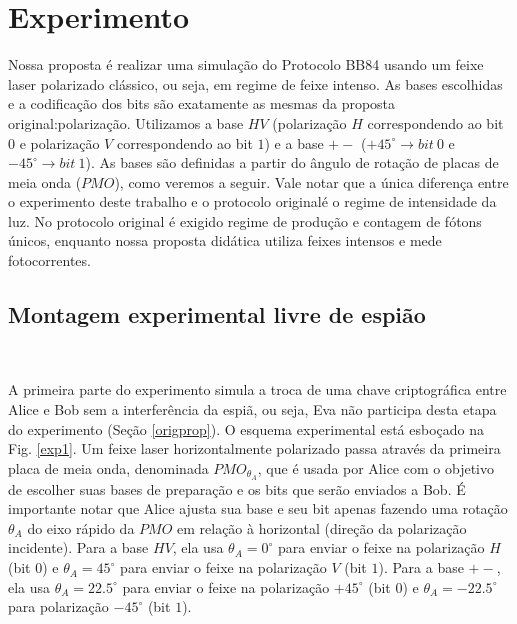 \documentclass[pra, twocolumn]{revtex4}
\begin{document}
\section{Experimento}

Nossa proposta \'e realizar uma simula\c c\~ao do Protocolo BB84 usando um feixe laser polarizado cl\'assico, ou seja, em regime de feixe intenso. As bases escolhidas e a codifica\c c\~ao dos bits s\~ao exatamente as mesmas da proposta original:polariza\c c\~ao. Utilizamos a base $HV$ (polariza\c c\~ao $H$ correspondendo ao bit $0$ e polariza\c c\~ao $V$ correspondendo ao bit $1$) e a base $+-$ ($+45^\circ \rightarrow bit~ 0$ e $-45^\circ \rightarrow bit ~ 1$). As bases s\~ao definidas a partir do \^angulo de rota\c c\~ao de placas de meia onda ($PMO$), como veremos a seguir. Vale notar que a \'unica diferen\c ca entre o experimento deste trabalho e o protocolo original\'e o regime de intensidade da luz. No protocolo original \'e exigido regime de produ\c c\~ao e contagem de f\'otons \'unicos, enquanto nossa proposta did\'atica utiliza feixes intensos e mede fotocorrentes. 

\subsection{Montagem experimental livre de espi\~ao}\
\label{semEva}

A primeira parte do experimento simula a troca de uma chave criptogr\'afica entre Alice e Bob sem a interfer\^encia da espi\~a, ou seja, Eva n\~ao participa desta etapa do experimento (Se\c c\~ao \ref{origprop}). O esquema experimental est\'a esbo\c cado na Fig. \ref{exp1}. Um feixe laser horizontalmente polarizado passa atrav\'es da primeira placa de meia onda, denominada $PMO_{\theta_A} $, que \'e usada por Alice com o objetivo de escolher suas bases de prepara\c c\~ao e os bits que ser\~ao enviados a Bob. \'E importante notar que Alice ajusta sua base e seu bit apenas fazendo uma rota\c c\~ao  $\theta_A$ do eixo r\'apido da $PMO$ em rela\c c\~ao \`a horizontal (dire\c c\~ao da polariza\c c\~ao incidente). Para a base $HV$, ela usa $\theta_A = 0^\circ$ para enviar o feixe na polariza\c c\~ao $H$ (bit $0$) e $\theta_A = 45^\circ$ para enviar o feixe na polariza\c c\~ao $V$ (bit $1$). Para a base $+-$, ela usa  $\theta_A = 22.5^\circ$ para enviar o feixe na polariza\c c\~ao $+45^\circ$ (bit $0$) e $\theta_A = -22.5^\circ$ para polariza\c c\~ao $-45^\circ$ (bit $1$). 
\end{document}
